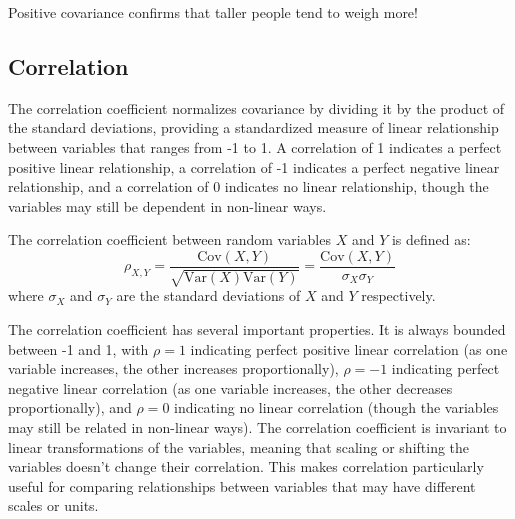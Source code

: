 Positive covariance confirms that taller people tend to weigh more!

\subsection{Correlation}

The correlation coefficient normalizes covariance by dividing it by the product of the standard deviations, providing a standardized measure of linear relationship between variables that ranges from -1 to 1. A correlation of 1 indicates a perfect positive linear relationship, a correlation of -1 indicates a perfect negative linear relationship, and a correlation of 0 indicates no linear relationship, though the variables may still be dependent in non-linear ways.

\begin{definition}
The correlation coefficient between random variables $X$ and $Y$ is defined as:
\begin{equation}
\rho_{X,Y} = \frac{\text{Cov}(X,Y)}{\sqrt{\text{Var}(X)\text{Var}(Y)}} = \frac{\text{Cov}(X,Y)}{\sigma_X \sigma_Y}
\end{equation}
where $\sigma_X$ and $\sigma_Y$ are the standard deviations of $X$ and $Y$ respectively.
\end{definition}

The correlation coefficient has several important properties. It is always bounded between -1 and 1, with $\rho = 1$ indicating perfect positive linear correlation (as one variable increases, the other increases proportionally), $\rho = -1$ indicating perfect negative linear correlation (as one variable increases, the other decreases proportionally), and $\rho = 0$ indicating no linear correlation (though the variables may still be related in non-linear ways). The correlation coefficient is invariant to linear transformations of the variables, meaning that scaling or shifting the variables doesn't change their correlation. This makes correlation particularly useful for comparing relationships between variables that may have different scales or units.
